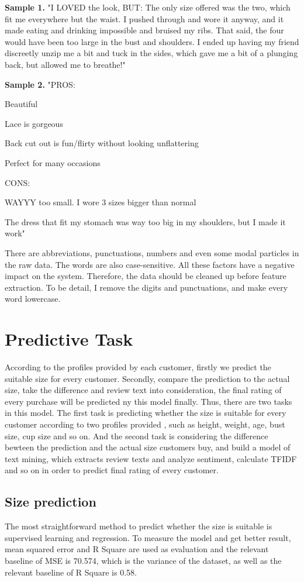 \documentclass[letterpaper, 10 pt, conference]{ieeeconf}  %
\begin{document}
\textbf{Sample 1.} "I LOVED the look, BUT: The only size offered was the two, which fit me everywhere but the waist. I pushed through and wore it anyway, and it made eating and drinking impossible and bruised my ribs. That said, the four would have been too large in the bust and shoulders. I ended up having my friend discreetly unzip me a bit and tuck in the sides, which gave me a bit of a plunging back, but allowed me to breathe!"

\textbf{Sample 2.} "PROS: 

Beautiful

Lace is gorgeous

Back cut out is fun/flirty without looking unflattering

Perfect for many occasions


CONS: 

WAYYY too small. I wore 3 sizes bigger than normal

The dress that fit my stomach was way too big in my shoulders, but I made it work"



There are abbreviations, punctuations, numbers and even some modal particles in the raw data. The words are also case-sensitive. All these factors have a negative impact on the system. Therefore, the data should be cleaned up before feature extraction. To be detail, I remove the digits and punctuations, and make every word lowercase.



\section{Predictive Task}
According to the profiles provided by each customer, firstly we predict the suitable size for every customer. Secondly, compare the prediction to the actual size, take the difference and review text into consideration, the final rating of every purchase will be predicted ny this model finally.
Thus, there are two tasks in this model. The first task is predicting whether the size is suitable for every customer according to two profiles provided , such as height, weight, age, bust size, cup size and so on. And the second task is considering the difference bewteen the prediction and the actual size customers buy,
and build a model of text mining, which extracts review texts and analyze sentiment, calculate TFIDF and so on in order to predict final rating of every customer.

\subsection{Size prediction}
The most straightforward method to predict whether the size is suitable is supervised learning and regression. To measure the model and get better result, mean squared error and R Square are used as evaluation and the relevant baseline of MSE is 70.574, which is the variance of the dataset, as well as the relevant baseline of R Square is 0.58. 
\end{document}
